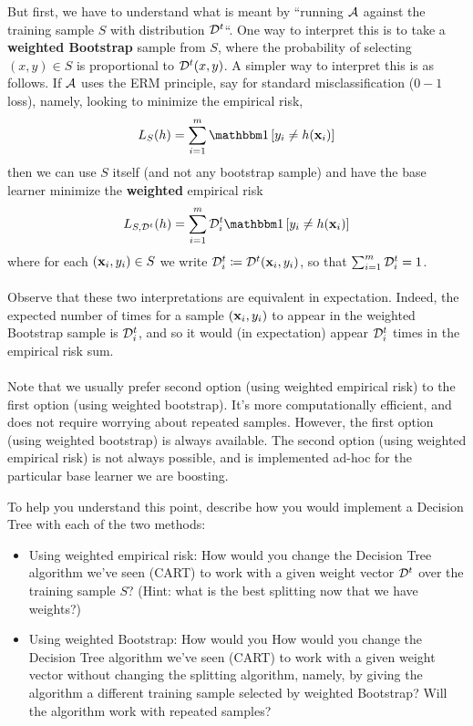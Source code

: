 But first, we have to understand  what is meant by ``running $\mathcal{A}$ against the training sample $S$ with distribution $\mathcal{D}^t$``. One way to interpret this is to take a \textbf{weighted Bootstrap} sample from $S$, where the probability of selecting $(x,y)\in S$ is proportional to $\mathcal{D}^t(x,y)$. A simpler way to interpret this is as follows. If $\mathcal{A}$ uses the ERM principle, say for standard misclassification ($0-1$ loss), namely, looking to minimize the empirical risk,
$$ L_S(h) = \sum_{i=1}^m \indc{y_i \neq h(\x_i)} $$
then we can use $S$ itself (and not any bootstrap sample) and have the base learner minimize the \textbf{weighted} empirical risk
$$ L_{S,\Dc^t}(h) = \sum_{i=1}^m \Dc^t_i\indc{y_i \neq h(\x_i)} $$
where for each $(\mathbf{x}_i,y_i)\in S$ we write $\mathcal{D}^t_i \coloneqq \mathcal{D}^t(\mathbf{x}_i,y_i)$, so that $\sum_{i=1}^m \mathcal{D}^t_i =1$.
\\~\\
Observe that these two interpretations are equivalent in expectation. Indeed, the expected number of times for a sample $(\mathbf{x}_i,y_i)$ to appear in the weighted Bootstrap sample is $\mathcal{D}^t_i$, and so it would (in expectation) appear $\mathcal{D}^t_i$ times in the empirical risk sum. 
\\~\\
Note that we usually prefer second option (using weighted empirical risk) to the first option (using weighted bootstrap). It's more computationally efficient, and does not require worrying about repeated samples. However, the first option (using weighted bootstrap) is always available. The second option (using weighted empirical risk) is not always possible, and is implemented ad-hoc for the particular base learner we are boosting.

\begin{exercise}
To help you understand this point, describe how you would implement a Decision
Tree with each of the two methods:
\begin{itemize}
	\item Using weighted empirical risk: How would you change the Decision Tree
	algorithm we've seen (CART) to work with a given weight vector $\mathcal{D}^t$ over
	the training sample $S$? (Hint: what is the best splitting now that we have
	weights?)
	\item Using weighted Bootstrap: How would you How would you change the Decision Tree
	algorithm we've seen (CART)  to work with a given weight vector without
	changing the splitting algorithm, namely, by giving the algorithm a
	different training sample selected by weighted Bootstrap? Will the algorithm
	work with repeated samples?
\end{itemize}
\end{exercise}

